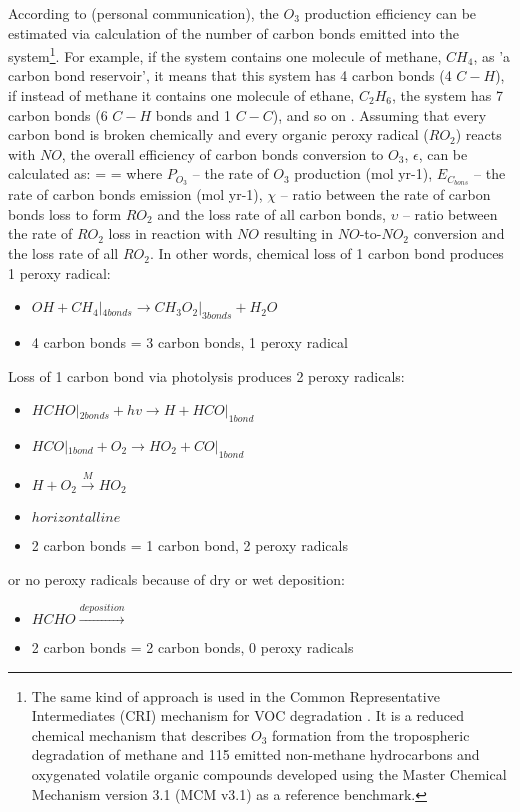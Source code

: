 \documentclass[11pt,a4paper]{article}
\newcounter{matriz}
\newenvironment{matriz}{\refstepcounter{matriz}\equation}{\tag{\thematriz}\endequation}
\begin{document}
According to \cite{Evans2014} (personal communication), the $O_3$ production efficiency can be estimated via calculation of the number of carbon bonds emitted into the system\footnote{The same kind of approach is used in the Common Representative Intermediates (CRI) mechanism for VOC degradation \citep{Jenkin2002, Jenkin2008}. It is a reduced chemical mechanism that describes $O_3$ formation from the tropospheric degradation of methane and 115 emitted non-methane hydrocarbons and oxygenated volatile organic compounds developed using the Master Chemical Mechanism version 3.1 (MCM v3.1) as a reference benchmark.}. For example, if the system contains one molecule of methane, $CH_4$, as 'a carbon bond reservoir', it means that this system has 4 carbon bonds (4 $C-H$), if  instead of methane it contains one molecule of ethane, $C_2H_6$, the system has 7 carbon bonds (6 $C-H$ bonds and 1 $C-C$), and so on \citep{Edwards2013}. Assuming that every carbon bond is broken chemically and every organic peroxy radical ($RO_2$) reacts with $NO$, the overall efficiency of carbon bonds conversion to $O_3$, $\epsilon$, can be calculated as: 
\begin{matriz} \label{eq:epsilon}
\epsilon =  = \chi\cdot\upsilon
\end{matriz}
where $P_{O_3}$ – the rate of $O_3$ production (mol yr-1), $E_{C_{bons}}$  – the rate of carbon bonds emission (mol yr-1), $\chi$ – ratio between the rate of carbon bonds loss to form $RO_2$ and the loss rate of all carbon bonds, $\upsilon$ – ratio between the rate of $RO_2$ loss in reaction with $NO$ resulting in $NO$-to-$NO_2$ conversion and the loss rate of all $RO_2$. In other words, chemical loss of 1 carbon bond produces 1 peroxy radical:
\begin{itemize}
\centering
\item[] $OH + {CH_4}|_{4 bonds} \rightarrow {CH_3O_2}|_{3 bonds} + H_2O$
\item[] 4 carbon bonds = 3 carbon bonds, 1 peroxy radical
\end{itemize}
Loss of 1 carbon bond via photolysis produces 2 peroxy radicals:
\begin{itemize}
\centering
\item[] ${HCHO}|_{2bonds} + hv \rightarrow H + {HCO}|_{1bond}$
\item[] ${HCO}|_{1bond} + O_2 \rightarrow HO_2 + {CO}|_{1bond}$
\item[] $H + O_2 \xrightarrow{M} HO_2$
\item[] $horizontal line$
\item[] 2 carbon bonds = 1 carbon bond, 2 peroxy radicals
\end{itemize}
or no peroxy radicals because of dry or wet deposition:
\begin{itemize}
\centering
\item[] $HCHO \xrightarrow{deposition}$
\item[] 2 carbon bonds = 2 carbon bonds, 0 peroxy radicals
\end{itemize}
\end{document}
